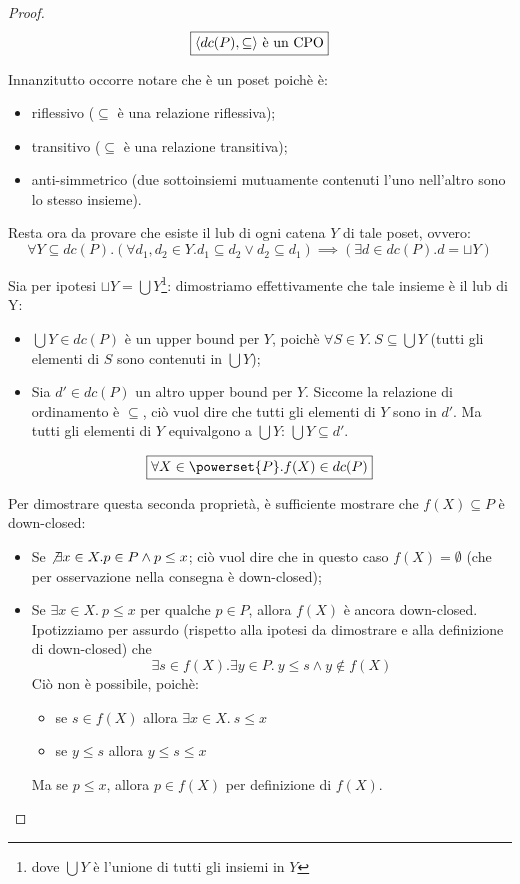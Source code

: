 \begin{proof}

$$
\boxed{\text{\ensuremath{\langle{}dc(P), \subseteq\rangle{}} è un CPO}}
$$

Innanzitutto occorre notare che  è un poset poichè è:

\begin{itemize}
  \item riflessivo ($\subseteq$ è una relazione riflessiva);
  \item transitivo ($\subseteq$ è una relazione transitiva);
  \item anti-simmetrico (due sottoinsiemi mutuamente contenuti l'uno nell'altro
    sono lo stesso insieme).
\end{itemize}

Resta ora da provare che esiste il lub di ogni catena $Y$ di tale poset, ovvero:
$$
\forall{Y}\subseteq dc(P).
          (\forall{d_1,d_2}\in Y.d_1 \subseteq d_2 \lor d_2 \subseteq d_1)
              \implies
          (\exists{d}\in dc(P). d = \sqcup Y)
$$

Sia per ipotesi $\sqcup Y = \bigcup Y$\footnote{dove $\bigcup Y$ è l'unione di
tutti gli insiemi in $Y$}: dimostriamo effettivamente che tale insieme è il lub
di Y:
\begin{itemize}
  \item $\bigcup Y \in dc(P)$ è un upper bound per $Y$, poichè
    $\forall{S}\in Y.\ S \subseteq \bigcup Y$ (tutti gli elementi di $S$ sono
    contenuti in $\bigcup Y$);
  \item Sia $d'\in dc(P)$ un altro upper bound per $Y$. Siccome la relazione di
    ordinamento è $\subseteq$, ciò vuol dire che tutti gli elementi di $Y$ sono
    in $d'$. Ma tutti gli elementi di $Y$ equivalgono a $\bigcup Y$:
    $\bigcup Y \subseteq d'$.
\end{itemize}

$$
\boxer{\forall{X} \in \powerset{P}. f(X) \in dc(P)}
$$

Per dimostrare questa seconda proprietà, è sufficiente mostrare che
$f(X) \subseteq P$ è down-closed:

\begin{itemize}
  \item Se $\not \exists{x}\in X. p\in P \land p \leq x$; ciò vuol dire che in
    questo caso $f(X) = \emptyset$ (che per osservazione nella consegna è
    down-closed);
  \item Se $\exists{x}\in X.\ p \leq x$ per qualche $p \in P$, allora $f(X)$ è
    ancora down-closed. Ipotizziamo per assurdo (rispetto alla ipotesi da
    dimostrare e alla definizione di down-closed) che
    $$
    \exists{s\in f(X)}.\exists{y}\in P.\ y \leq s \land y \not \in f(X)
    $$
    Ciò non è possibile, poichè:
    \begin{itemize}
      \item se $s \in f(X)$ allora $\exists{x}\in X.\ s \leq x$
      \item se $y \leq s$ allora $y \leq s \leq x$
    \end{itemize}
    Ma se $p \leq x$, allora $p \in f(X)$ per definizione di $f(X)$.
\end{itemize}


\end{proof}
